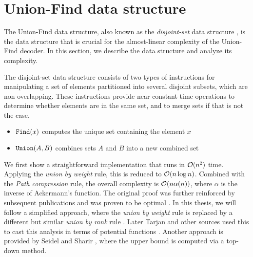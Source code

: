 \chapter{Union-Find data structure}\label{ap:unionfind}
The Union-Find data structure, also known as the \emph{disjoint-set} data structure \cite{tarjan1975efficiency}, is the data structure that is crucial for the almost-linear complexity of the Union-Find decoder. In this section, we describe the data structure and analyze its complexity. 

The disjoint-set data structure consists of two types of instructions for manipulating a set of elements partitioned into several disjoint subsets, which are non-overlapping. These instructions provide near-constant-time operations to determine whether elements are in the same set, and to merge sets if that is not the case. 
\begin{itemize}
  \item $\texttt{Find}(x)$ computes the unique set containing the element $x$
  \item $\texttt{Union}(A,B)$ combines sets $A$ and $B$ into a new combined set
\end{itemize}
We first show a straightforward implementation that runs in $\mathcal{O}(n^2)$ time. Applying the \emph{union by weight} rule, this is reduced to $\mathcal{O}(n \log n)$. Combined with the \emph{Path compression} rule, the overall complexity is $\mathcal{O}(n \alpha (n))$, where $\alpha$ is the inverse of Ackermann's function. The original proof \cite{tarjan1975efficiency} was further reinforced by subsequent publications \cite{tarjan1979class,tarjan1984worst} and was proven to be optimal \cite{fredman1989cell}. In this thesis, we will follow a simplified approach, where the \emph{union by weight} rule is replaced by a different but similar \emph{union by rank} rule \cite{kozen1992design}. Later Tarjan and other sources used this to cast this analysis in terms of potential functions \cite{tarjan1999handout, harfst2000potential, cormen2009introduction}. Another approach is provided by Seidel and Sharir \cite{seidel2005top}, where the upper bound is computed via a top-down method. 

